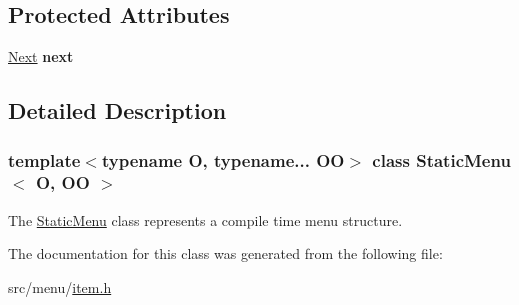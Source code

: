 \subsection*{Protected Attributes}
\begin{DoxyCompactItemize}
\item 
\mbox{\label{classStaticMenu_ae40bedb36c3a6a8e798fc672fdb5ee0a}} 
\hyperlink{classStaticMenu}{Next} {\bfseries next}
\end{DoxyCompactItemize}


\subsection{Detailed Description}
\subsubsection*{template$<$typename O, typename... OO$>$\newline
class Static\+Menu$<$ O, O\+O $>$}

The \hyperlink{classStaticMenu}{Static\+Menu} class represents a compile time menu structure. 

The documentation for this class was generated from the following file\+:\begin{DoxyCompactItemize}
\item 
src/menu/\hyperlink{item_8h}{item.\+h}\end{DoxyCompactItemize}
